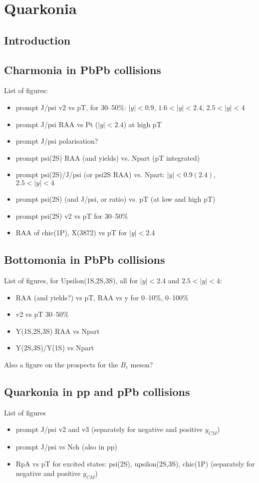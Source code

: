 \documentclass[../report.tex]{subfiles}
\begin{document}
\section{Quarkonia}

\subsection{Introduction}

\subsection{Charmonia in PbPb collisions}

List of figures:
\begin{itemize}
  \item prompt J/psi v2 vs pT, for 30--50\%: $|y|<0.9$, $1.6<|y|<2.4$, $2.5<|y|<4$
  \item prompt J/psi RAA vs Pt ($|y|<2.4$) at high pT
  \item prompt J/psi polarisation?
  \item prompt psi(2S) RAA (and yields) vs. Npart (pT integrated) 
  \item prompt psi(2S)/J/psi (or psi2S RAA) vs. Npart: $|y|<0.9 (2.4)$, $2.5<|y|<4$
  \item prompt psi(2S) (and J/psi, or ratio) vs. pT (at low and high pT) 
  \item prompt psi(2S) v2 vs pT for 30--50\%
  \item RAA of chic(1P), X(3872) vs pT for $|y|<2.4$
\end{itemize}

\subsection{Bottomonia in PbPb collisions}

List of figures, for Upsilon(1S,2S,3S), all for $|y|<2.4$ and $2.5<|y|<4$:
\begin{itemize}
 \item  RAA (and yields?) vs pT, RAA vs y for 0--10\%, 0--100\% 
 \item v2 vs pT 30--50\%
 \item Y(1S,2S,3S) RAA vs Npart
 \item Y(2S,3S)/Y(1S) vs Npart  
\end{itemize}

Also a figure on the prospects for the $B_c$ meson?

\subsection{Quarkonia in pp and pPb collisions}

List of figures
\begin{itemize}
  \item prompt J/psi v2 and v3 (separately for negative and positive $y_{CM}$)
  \item prompt J/psi vs Nch (also in pp)
  \item RpA vs pT for excited states: psi(2S), upsilon(2S,3S), chic(1P) (separately for negative and positive $y_{CM}$)
\end{itemize}
\end{document}

